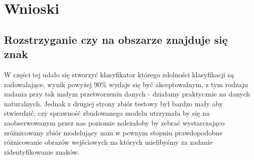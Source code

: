 \documentclass{classrep}
\begin{document}
\section{Wnioski}

\subsection{Rozstrzyganie czy na obszarze znajduje się znak}
W części tej udało się stworzyć klasyfikator którego zdolności klasyfikacji są zadowalające, wynik powyżej 90\% wydaje się być akceptowalnym, z tym rodzaju zadania przy tak małym przetworzeniu danych - działamy praktycznie na danych naturalnych. Jednak z drugiej strony zbiór testowy był bardzo mały aby stwierdzić, czy sprawność zbudowanego modelu utrzymała by się na zaobserwowanym przez nas poziomie należałoby by zebrać wystarczająco zróżnicowany zbiór modelujący nam w pewnym stopniu prawdopodobne różnicowanie obrazów wejściowych na których mielibyśmy za zadanie zidentyfikowanie znaków. 




\end{document}

